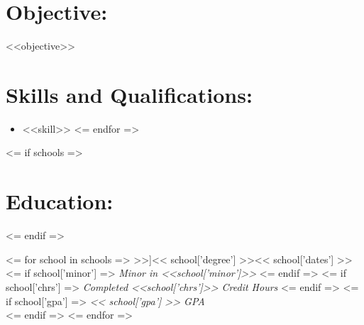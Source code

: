 \documentclass{resume}
\author{ <<author>> }
\begin{document}
\maketitle

\section{Objective:}

\small <<objective>> \normalsize

\section{Skills and Qualifications:}
\small\begin{itemize}
<= for skill in skills =>
    \item <<skill>>
<= endfor =>
\end{itemize}\normalsize

<= if schools =>
    \section{Education:}
<= endif =>

<= for school in schools =>
    \affiliation[<< school['place'] >>]{<< school['degree'] >>}{<< school['dates'] >>}
    <= if school['minor'] =>
        \textit{Minor in <<school['minor']>>}
    <= endif =>
    <= if school['chrs'] =>
        \textit{Completed <<school['chrs']>> Credit Hours}
    <= endif =>
    <= if school['gpa'] =>
        \emph{ << school['gpa'] >> GPA}\\
    <= endif =>
<= endfor =>
\end{document}
